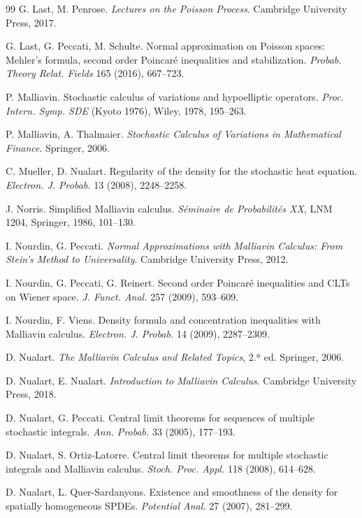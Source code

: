 \begin{thebibliography}{99}
 G. Last, M. Penrose. \emph{Lectures on the Poisson Process}. Cambridge University Press, 2017.

 G. Last, G. Peccati, M. Schulte. Normal approximation on Poisson spaces: Mehler's formula, second
order Poincaré inequalities and stabilization. \emph{Probab. Theory Relat. Fields} 165 (2016), 667--723.

 P. Malliavin. Stochastic calculus of variations and hypoelliptic operators. \emph{Proc. Intern. Symp. SDE}
(Kyoto 1976), Wiley, 1978, 195--263.

 P. Malliavin, A. Thalmaier. \emph{Stochastic Calculus of Variations in Mathematical Finance}. Springer,
2006.

 C. Mueller, D. Nualart. Regularity of the density for the stochastic heat equation. \emph{Electron. J.
Probab.} 13 (2008), 2248--2258.

 J. Norris. Simplified Malliavin calculus. \emph{Séminaire de Probabilités XX}, LNM 1204, Springer, 1986,
101--130.

 I. Nourdin, G. Peccati. \emph{Normal Approximations with Malliavin Calculus: From Stein's Method to
Universality}. Cambridge University Press, 2012.

 I. Nourdin, G. Peccati, G. Reinert. Second order Poincaré inequalities and CLTs on Wiener space.
\emph{J. Funct. Anal.} 257 (2009), 593--609.

 I. Nourdin, F. Viens. Density formula and concentration inequalities with Malliavin calculus.
\emph{Electron. J. Probab.} 14 (2009), 2287--2309.

 D. Nualart. \emph{The Malliavin Calculus and Related Topics}, 2.ª ed. Springer, 2006.

 D. Nualart, E. Nualart. \emph{Introduction to Malliavin Calculus}. Cambridge University Press, 2018.

 D. Nualart, G. Peccati. Central limit theorems for sequences of multiple stochastic integrals. \emph{Ann.
Probab.} 33 (2005), 177--193.

 D. Nualart, S. Ortiz-Latorre. Central limit theorems for multiple stochastic integrals and Malliavin
calculus. \emph{Stoch. Proc. Appl.} 118 (2008), 614--628.

 D. Nualart, L. Quer-Sardanyons. Existence and smoothness of the density for spatially homogeneous
SPDEs. \emph{Potential Anal.} 27 (2007), 281--299.


\end{thebibliography}
